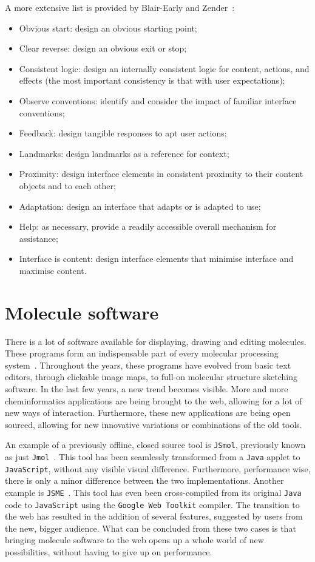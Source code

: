 A more extensive list is provided by Blair-Early and Zender~\cite{blair2008user}:
\begin{itemize}[noitemsep,topsep=0pt,parsep=0pt,partopsep=0pt]
\item Obvious start: design an obvious starting point;
\item Clear reverse: design an obvious exit or stop;
\item Consistent logic: design an internally consistent logic for content, actions, and effects (the most important consistency is that with user expectations);
\item Observe conventions: identify and consider the impact of familiar interface conventions;
\item Feedback: design tangible responses to apt user actions;
\item Landmarks: design landmarks as a reference for context;
\item Proximity: design interface elements in consistent proximity to their content objects and to each other;
\item Adaptation: design an interface that adapts or is adapted to use;
\item Help: as necessary, provide a readily accessible overall mechanism for assistance;
\item Interface is content: design interface elements that minimise interface and maximise content.
\end{itemize}


\section{Molecule software}

There is a lot of software available for displaying, drawing and editing molecules. These programs form an indispensable part of every molecular processing system~\cite{ertl2010molecular}. Throughout the years, these programs have evolved from basic text editors, through clickable image maps, to full-on molecular structure sketching software. In the last few years, a new trend becomes visible. More and more cheminformatics applications are being brought to the web, allowing for a lot of new ways of interaction. Furthermore, these new applications are being open sourced, allowing for new innovative variations or combinations of the old tools.

An example of a previously offline, closed source tool is \verb|JSmol|, previously known as just \verb|Jmol|~\cite{hanson2013jsmol}. This tool has been seamlessly transformed from a \verb|Java| applet to \verb|JavaScript|, without any visible visual difference. Furthermore, performance wise, there is only a minor difference between the two implementations. Another example is \verb|JSME|~\cite{bienfait2013jsme}. This tool has even been cross-compiled from its original \verb|Java| code to \verb|JavaScript| using the \verb|Google Web Toolkit| compiler. The transition to the web has resulted in the addition of several features, suggested by users from the new, bigger audience. What can be concluded from these two cases is that bringing molecule software to the web opens up a whole world of new possibilities, without having to give up on performance.

